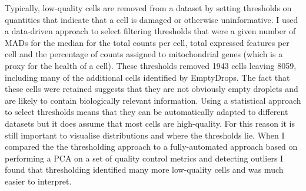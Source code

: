 \documentclass[11pt,a4paper,titlepage,twoside,openright]{style/unimelbthesis}
\theoremstyle{definition}
\theoremstyle{definition}
\theoremstyle{definition}
\theoremstyle{remark}
\begin{document}
\begin{mainmatter}
Typically, low-quality cells are removed from a dataset by setting thresholds on quantities that indicate that a cell is damaged or otherwise uninformative. I used a data-driven approach to select filtering thresholds that were a given number of MADs for the median for the total counts per cell, total expressed features per cell and the percentage of counts assigned to mitochondrial genes (which is a proxy for the health of a cell). These thresholds removed 1943 cells leaving 8059, including many of the additional cells identified by EmptyDrops. The fact that these cells were retained suggests that they are not obviously empty droplets and are likely to contain biologically relevant information. Using a statistical approach to select thresholds means that they can be automatically adapted to different datasets but it does assume that most cells are high-quality. For this reason it is still important to visualise distributions and where the thresholds lie. When I compared the the thresholding approach to a fully-automated approach based on performing a PCA on a set of quality control metrics and detecting outliers I found that thresholding identified many more low-quality cells and was much easier to interpret.


\end{mainmatter}
\end{document}
